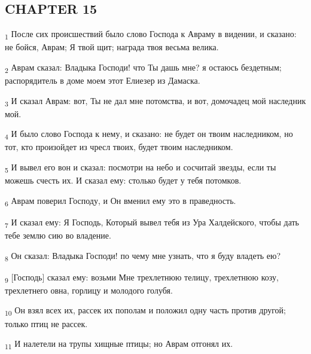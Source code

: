 \subsection{CHAPTER 15}
\begin{tcolorbox}
\textsubscript{1} После сих происшествий было слово Господа к Авраму в видении, и сказано: не бойся, Аврам; Я твой щит; награда твоя весьма велика.
\end{tcolorbox}
\begin{tcolorbox}
\textsubscript{2} Аврам сказал: Владыка Господи! что Ты дашь мне? я остаюсь бездетным; распорядитель в доме моем этот Елиезер из Дамаска.
\end{tcolorbox}
\begin{tcolorbox}
\textsubscript{3} И сказал Аврам: вот, Ты не дал мне потомства, и вот, домочадец мой наследник мой.
\end{tcolorbox}
\begin{tcolorbox}
\textsubscript{4} И было слово Господа к нему, и сказано: не будет он твоим наследником, но тот, кто произойдет из чресл твоих, будет твоим наследником.
\end{tcolorbox}
\begin{tcolorbox}
\textsubscript{5} И вывел его вон и сказал: посмотри на небо и сосчитай звезды, если ты можешь счесть их. И сказал ему: столько будет у тебя потомков.
\end{tcolorbox}
\begin{tcolorbox}
\textsubscript{6} Аврам поверил Господу, и Он вменил ему это в праведность.
\end{tcolorbox}
\begin{tcolorbox}
\textsubscript{7} И сказал ему: Я Господь, Который вывел тебя из Ура Халдейского, чтобы дать тебе землю сию во владение.
\end{tcolorbox}
\begin{tcolorbox}
\textsubscript{8} Он сказал: Владыка Господи! по чему мне узнать, что я буду владеть ею?
\end{tcolorbox}
\begin{tcolorbox}
\textsubscript{9} [Господь] сказал ему: возьми Мне трехлетнюю телицу, трехлетнюю козу, трехлетнего овна, горлицу и молодого голубя.
\end{tcolorbox}
\begin{tcolorbox}
\textsubscript{10} Он взял всех их, рассек их пополам и положил одну часть против другой; только птиц не рассек.
\end{tcolorbox}
\begin{tcolorbox}
\textsubscript{11} И налетели на трупы хищные птицы; но Аврам отгонял их.
\end{tcolorbox}
